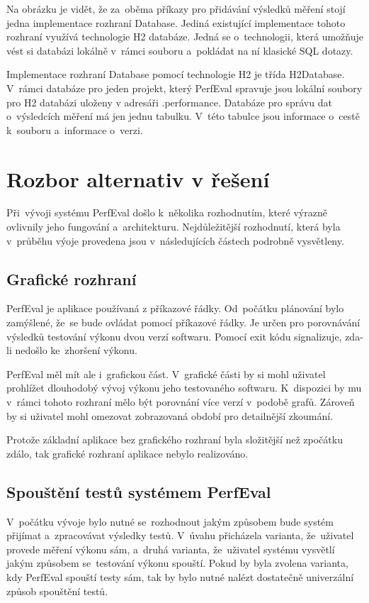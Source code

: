 Na obrázku je vidět, že za~oběma příkazy pro přidávání výsledků měření stojí jedna implementace rozhraní Database.
Jediná existující implementace tohoto rozhraní využívá technologie H2 databáze. Jedná se o~technologii, která umožňuje
vést si databázi lokálně v~rámci souboru a~pokládat na ní klasické SQL dotazy.

Implementace rozhraní Database pomocí technologie H2 je třída H2Database. V~rámci databáze pro jeden projekt, který
PerfEval spravuje jsou lokální soubory pro H2 databázi uloženy v adresáři .performance. Databáze pro správu dat o~výsledcích
měření má jen jednu tabulku. V~této tabulce jsou informace o~cestě k~souboru a~informace o~verzi.

\section{Rozbor alternativ v řešení}
Při~vývoji systému PerfEval došlo k~několika rozhodnutím, které výrazně ovlivnily jeho fungování a~architekturu.
Nejdůležitější rozhodnutí, která byla v~průběhu výoje provedena jsou v~následujících částech podrobně vysvětleny.

\subsection{Grafické rozhraní}
PerfEval je aplikace používaná z příkazové řádky. Od~počátku plánování bylo zamýšlené, že~se bude
ovládat pomocí příkazové řádky. Je určen pro porovnávání výsledků testování výkonu dvou verzí softwaru.
Pomocí exit kódu signalizuje, zda-li nedošlo ke~zhoršení výkonu.

PerfEval měl mít ale i~grafickou část. V~grafické části by si mohl uživatel prohlížet dlouhodobý vývoj
výkonu jeho testovaného softwaru. K~dispozici by mu v~rámci tohoto rozhraní mělo být porovnání více verzí
v~podobě grafů. Zároveň by si uživatel mohl omezovat zobrazovaná období pro detailnější zkoumání.

Protože základní aplikace bez grafického rozhraní byla složitější než zpočátku zdálo, tak grafické
rozhraní aplikace nebylo realizováno.

\subsection{Spouštění testů systémem PerfEval}
V~počátku vývoje bylo nutné se~rozhodnout jakým způsobem bude systém přijímat a~zpracovávat výsledky testů.
V~úvahu přicházela varianta, že~uživatel provede měření výkonu sám, a~druhá varianta, že~uživatel systému
vysvětlí jakým způsobem se~testování výkonu spouští. Pokud by byla zvolena varianta, kdy PerfEval spouští testy
sám, tak by bylo nutné nalézt dostatečně univerzální způsob spouštění testů.

